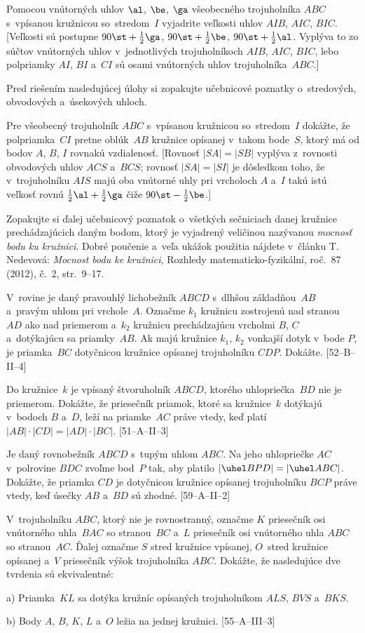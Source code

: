 {
Pomocou vnútorných uhlov $\al$, $\be$, $\ga$ všeobecného trojuholníka $ABC$
s~vpísanou kružnicou so~stredom~$I$ vyjadrite veľkosti uhlov $AIB$, $AIC$,
$BIC$. [Veľkosti sú postupne $90\st+\frac12\ga$,
$90\st+\frac12\be$, $90\st+\frac12\al$. Vyplýva to zo súčtov
vnútorných uhlov v~jednotlivých trojuholníkoch $AIB$, $AIC$,
$BIC$, lebo polpriamky $AI$, $BI$ a~$CI$ sú osami vnútorných
uhlov trojuholníka~$ABC$.]

\titem
Pred riešením nasledujúcej úlohy si zopakujte učebnicové poznatky
o~stredových, obvodových a~úsekových uhloch.

Pre všeobecný trojuholník $ABC$ s~vpísanou kružnicou so~stredom~$I$
dokážte, že polpriamka~$CI$ pretne oblúk~$AB$
kružnice opísanej v~takom bode~$S$, ktorý má od bodov
$A$, $B$, $I$ rovnakú vzdialenosť. [Rovnosť $|SA|=|SB|$ vyplýva
z~rovnosti obvodových uhlov $ACS$ a~$BCS$; rovnosť $|SA|=|SI|$ je
dôsledkom toho, že v~trojuholníku $AIS$ majú oba vnútorné uhly pri vrcholoch
$A$ a~$I$ takú istú veľkosť rovnú $\frac12\al+\frac12\ga$ čiže
$90\st-\frac12\be$.]

\titem
Zopakujte si ďalej učebnicový poznatok o~všetkých sečniciach danej
kružnice prechádzajúcich daným bodom,  ktorý je vyjadrený veličinou
nazývanou {\it mocnosť bodu ku kružnici}. Dobré poučenie a~veľa
ukážok použitia nájdete v~článku T. Nedevová: {\it Mocnost bodu ke
kružnici}, Rozhledy matematicko-fyzikální, roč.~87\,(2012), č.~2,
str.~9--17.

V~rovine je daný pravouhlý lichobežník $ABCD$ s~dlhšou základňou~$AB$ a~pravým uhlom pri vrchole~$A$. Označme $k_1$ kružnicu
zostrojenú nad stranou~$AD$ ako nad priemerom a~$k_2$ kružnicu
prechádzajúcu vrcholmi $B$, $C$ a~dotýkajúcu sa priamky~$AB$.
Ak majú kružnice $k_1$, $k_2$ vonkajší dotyk v~bode $P$, je priamka~$BC$ dotyčnicou kružnice opísanej trojuholníku $CDP$. Dokážte.
[52--B--II--4]

Do kružnice~$k$ je vpísaný štvoruholník $ABCD$, ktorého uhlopriečka~$BD$ nie je priemerom. Dokážte, že priesečník priamok, ktoré sa
kružnice~$k$ dotýkajú v~bodoch $B$ a~$D$, leží na priamke~$AC$
práve vtedy, keď platí $|AB|\cdot|CD|=|AD|\cdot|BC|$. [51--A--II--3]

Je daný rovnobežník $ABCD$ s~tupým uhlom $ABC$. Na jeho uhlopriečke
$AC$ v~polrovine $BDC$ zvoľme bod~$P$ tak, aby platilo $|\uhel
BPD|=|\uhel ABC|$. Dokážte, že priamka $CD$ je dotyčnicou kružnice
opísanej trojuholníku $BCP$ práve vtedy, keď úsečky $AB$ a~$BD$ sú zhodné.
[59--A--II--2]

V~trojuholníku $ABC$, ktorý nie je rovnostranný, označme $K$ priesečník osi
vnútorného uhla~$BAC$ so stranou~$BC$ a~$L$ priesečník osi vnútorného uhla
$ABC$ so stranou~$AC$. Ďalej označme $S$ stred kružnice vpísanej,
$O$~stred kružnice opísanej a~$V$ priesečník výšok trojuholníka $ABC$.
Dokážte, že nasledujúce dve tvrdenia sú ekvivalentné:
\item{a)} Priamka~$KL$ sa dotýka kružníc opísaných trojuholníkom $ALS$, $BVS$ a~$BKS$.
\item{b)} Body $A$, $B$, $K$, $L$ a~$O$ ležia na jednej kružnici.
[55--A--III--3]

}
